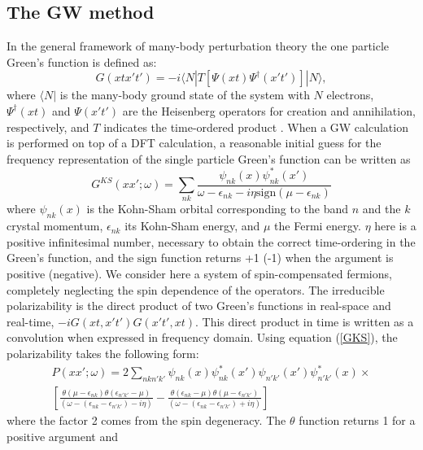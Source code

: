 \documentclass[11pt]{article}
\begin{document}
\subsection{The GW method}

In the general framework of many-body perturbation theory
the one particle Green's function is defined as:
\begin{equation}
G(xtx't')=-i\langle N|T[\Psi(xt)\Psi^\dagger(x't')]|N\rangle,
\end{equation}
where $\langle N|$ is the many-body ground state of the system with $N$
electrons,
 $\Psi^\dagger(xt)$ and 
$\Psi(x't')$ are the Heisenberg operators for creation and annihilation,
respectively, and 
$T$ indicates the time-ordered product \cite{fett-wale71book}.
When a GW calculation is performed on top of a DFT calculation,
a reasonable initial guess for the frequency representation of
the single particle Green's function can be written as
\begin{equation}\label{GKS}
G^{KS}(xx';\omega) = \sum_{nk}
\frac{\psi_{nk}(x)\psi^*_{nk}(x')}{
      \omega-\epsilon_{nk}-i\eta\text{sign}(\mu-\epsilon_{nk})}
\end{equation}
where $\psi_{nk}(x)$ is the Kohn-Sham orbital corresponding to the
band $n$ and the $k$ crystal momentum, $\epsilon_{nk}$ its Kohn-Sham energy,
and $\mu$ the Fermi energy.
$\eta$ here is a positive infinitesimal number, necessary to obtain
the correct time-ordering in the Green's function,
and the $\text{sign}$ function returns +1 (-1)
when the argument is positive (negative).
We consider here a system of spin-compensated fermions,
completely neglecting the spin dependence of the operators.
The irreducible polarizability is
the direct product of two Green's functions in real-space and real-time,
$-iG(xt,x't')G(x't',xt)$. This direct product in time is written as a convolution
when expressed in frequency domain. Using equation (\ref{GKS}),
the polarizability takes the following form:
\begin{multline}
\label{eq:polarizability}
P(xx';\omega) =
2\sum_{nkn'k'}
  \psi_{nk}(x)\psi^*_{nk}(x') \psi_{n'k'}(x')\psi^*_{n'k'}(x)\times \\
  [\frac{\theta(\mu-\epsilon_{nk})\theta(\epsilon_{n'k'}-\mu) }{
         (\omega-(\epsilon_{nk}-\epsilon_{n'k'})-i\eta)}-
\frac{\theta(\epsilon_{nk}-\mu)\theta(\mu-\epsilon_{n'k'}) }{
         (\omega-(\epsilon_{nk}-\epsilon_{n'k'})+i\eta)}]
\end{multline}
where the factor 2 comes from the spin degeneracy. 
The $\theta$ function returns 1 for a positive argument and 
\end{document}
